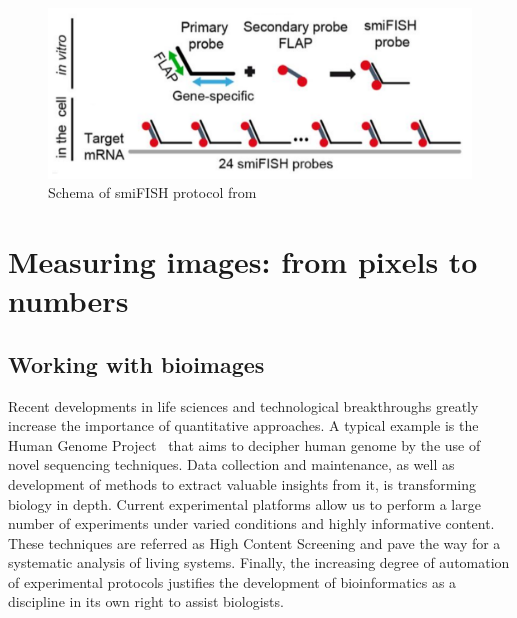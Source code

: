 
\begin{figure}
	\begin{center}
	\includegraphics[width=\linewidth]{figures/introduction/smiFISH}
	\caption[Schema of smiFISH protocol]{Schema of smiFISH protocol from~\cite{tsanov_smifish_2016}}
	\label{fig:smiFISH}
	\end{center}
\end{figure}


\section{Measuring images: from pixels to numbers}
\label{sec:computation_biology}

\subsection{Working with bioimages}
\label{subsec:intro_bioimages}

Recent developments in life sciences and technological breakthroughs greatly increase the importance of quantitative approaches.
A typical example is the Human Genome Project~\cite{lander_initial_2001} that aims to decipher human genome by the use of novel sequencing techniques.
Data collection and maintenance, as well as development of methods to extract valuable insights from it, is transforming biology in depth.
Current experimental platforms allow us to perform a large number of experiments under varied conditions and highly informative content.
These techniques are referred as High Content Screening and pave the way for a systematic analysis of living systems.
Finally, the increasing degree of automation of experimental protocols justifies the development of bioinformatics as a discipline in its own right to assist biologists.

